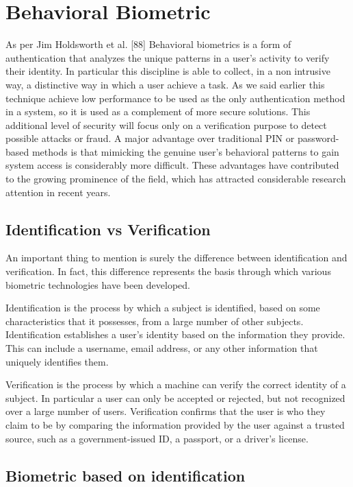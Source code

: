\documentclass{article}
\begin{document}
\section{Behavioral Biometric}
\noindent
As per Jim Holdsworth et al. [88] Behavioral biometrics is a form of authentication that analyzes the unique patterns in a user's activity to verify their identity. 
In particular this discipline is able to collect, in a non intrusive way, a distinctive way in which a user achieve a task.
As we said earlier this technique achieve low performance to be used as the only authentication method in a system, so it is used as a complement of more secure solutions.
This additional level of security will focus only on a verification purpose to detect possible attacks or fraud.
A major advantage over traditional PIN or password-based methods is that mimicking the genuine user's behavioral patterns to gain system access is considerably more difficult.
These advantages have contributed to the growing prominence of the field, which has attracted considerable research attention in recent years.

\subsection{Identification vs Verification}

An important thing to mention is surely the difference between identification and verification.
In fact, this difference represents the basis through which various biometric technologies have been developed.

Identification is the process by which a subject is identified, based on some characteristics that it possesses, from a large number of other subjects.
Identification establishes a user's identity based on the information they provide. 
This can include a username, email address, or any other information that uniquely identifies them.

Verification is the process by which a machine can verify the correct identity of a subject.
In particular a user can only be accepted or rejected, but not recognized over a large number of users.
Verification confirms that the user is who they claim to be by comparing the information provided by the user against a trusted source, such as a government-issued ID, a passport, or a driver's license.

\subsection{Biometric based on identification}
\end{document}
